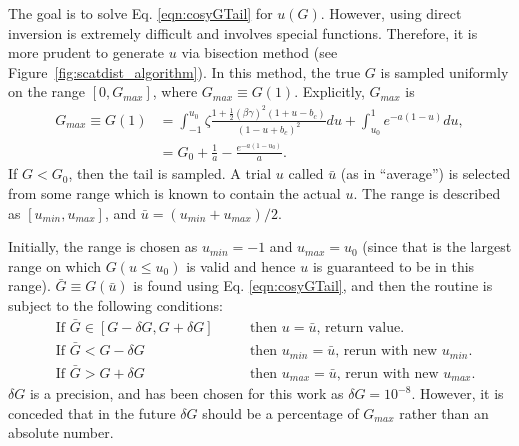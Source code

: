 The goal is to solve Eq. \eqref{eqn:cosyGTail} for $u(G)$. However, using direct inversion is extremely difficult and involves special functions. Therefore, it is more prudent to generate  $u$ via bisection method (see Figure~\ref{fig:scatdist_algorithm}). In this method, the true $G$ is sampled uniformly on the range $[0,G_{max}]$, where $G_{max} \equiv G(1)$. Explicitly, $G_{max}$ is
\begin{align*}
G_{max}\equiv G(1) &=\int_{-1} ^{u_0} \zeta\frac{1+\frac{1}{2}(\beta\gamma)^2(1+u-b_c)}{(1-u+b_c)^2}du+\int_{u_0} ^1 e^{-a(1-u)} du,\\
&= G_0+\frac{1}{a}-\frac{e^{-a(1-u_0)}}{a}.
\end{align*}
If $G < G_0$, then the tail is sampled. A trial $u$ called $\bar{u}$ (as in ``average'') is selected from some range which is known to contain the actual $u$. The range is described as $[u_{min},u_{max}]$, and $\bar{u}=(u_{min}+u_{max})/2$. 

Initially, the range is chosen as $u_{min}=-1$ and $u_{max}=u_0$ (since that is the largest range on which $G(u \leq u_0)$ is valid and hence $u$ is guaranteed to be in this range). $\bar{G} \equiv G(\bar{u})$ is found using Eq. \eqref{eqn:cosyGTail}, and then the routine is subject to the following conditions:
\begin{align*}
&\text{If } \bar{G}\in [G-\delta G,G+\delta G] &\quad &\text{then } u=\bar{u}\text{, return value.}\\
&\text{If } \bar{G} < G-\delta G &\quad &\text{then } u_{min}=\bar{u} \text{, rerun with new }u_{min}.\\
&\text{If } \bar{G} > G+\delta G &\quad &\text{then } u_{max}=\bar{u} \text{, rerun with new }u_{max}.
\end{align*}
$\delta G$ is a precision, and has been chosen for this work as $\delta G = 10^{-8}$. However, it is conceded that in the future $\delta G$ should be a percentage of $G_{max}$ rather than an absolute number.

